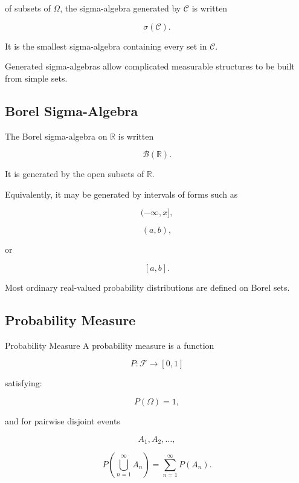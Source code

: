 of subsets of \(\Omega\), the sigma-algebra generated by \(\mathcal{C}\)
is written

\[
\boxed{
\sigma(\mathcal{C}).
}
\]

It is the smallest sigma-algebra containing every set in
\(\mathcal{C}\).

Generated sigma-algebras allow complicated measurable structures to be
built from simple sets.

\subsection{Borel Sigma-Algebra}
\label{subsec:borel-sigma-algebra-probability}

The Borel sigma-algebra on \(\mathbb{R}\) is written

\[
\boxed{
\mathcal{B}(\mathbb{R}).
}
\]

It is generated by the open subsets of \(\mathbb{R}\).

Equivalently, it may be generated by intervals of forms such as

\[
(-\infty,x],
\]

\[
(a,b),
\]

or

\[
[a,b].
\]

Most ordinary real-valued probability distributions are defined on
Borel sets.

\subsection{Probability Measure}
\label{subsec:probability-measure}

\begin{definitionbox}{Probability Measure}
A probability measure is a function

\[
P:\mathcal{F}\to[0,1]
\]

satisfying:

\[
\boxed{
P(\Omega)=1,
}
\]

and for pairwise disjoint events

\[
A_1,A_2,\ldots,
\]

\[
\boxed{
P
\left(
\bigcup_{n=1}^{\infty}A_n
\right)
=
\sum_{n=1}^{\infty}P(A_n).
}
\]
\end{definitionbox}

